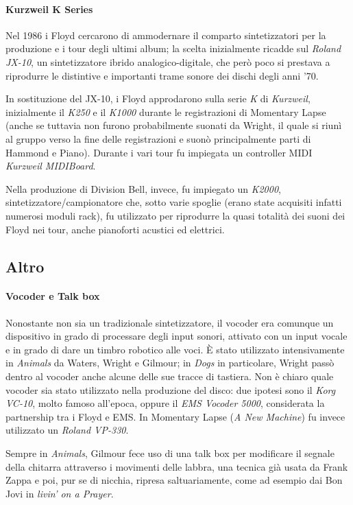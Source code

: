 \documentclass[class=book, crop=false, oneside, 12pt]{standalone}
\begin{document}
    \paragraph{Kurzweil K Series}
    Nel 1986 i Floyd cercarono di ammodernare il comparto sintetizzatori per la produzione e i  tour degli ultimi album; la scelta inizialmente ricadde sul \emph{Roland JX-10}, un sintetizzatore ibrido analogico-digitale, che però poco si prestava a riprodurre le distintive e importanti trame sonore dei dischi degli anni '70.

    In sostituzione del JX-10, i Floyd approdarono sulla serie \emph{K} di \emph{Kurzweil}, inizialmente il \emph{K250} e il \emph{K1000} durante le registrazioni di Momentary Lapse (anche se tuttavia non furono probabilmente suonati da Wright, il quale si riunì al gruppo verso la fine delle registrazioni e suonò principalmente parti di Hammond e Piano). Durante i vari tour fu impiegata un controller MIDI \emph{Kurzweil MIDIBoard}.

    Nella produzione di Division Bell, invece, fu impiegato un \emph{K2000}, sintetizzatore/campionatore che, sotto varie spoglie (erano state acquisiti infatti numerosi moduli rack), fu utilizzato per riprodurre la quasi totalità dei suoni dei Floyd nei tour, anche pianoforti acustici ed elettrici.
    
    \subsection{Altro}
    \paragraph{Vocoder e Talk box}
    Nonostante non sia un tradizionale sintetizzatore, il vocoder era comunque un dispositivo in grado di processare degli input sonori, attivato con un input vocale e in grado di dare un timbro robotico alle voci. È stato utilizzato intensivamente in \emph{Animals} da Waters, Wright e Gilmour; in \emph{Dogs} in particolare, Wright passò dentro al vocoder anche alcune delle sue tracce di tastiera. Non è chiaro quale vocoder sia stato utilizzato nella produzione del disco: due ipotesi sono il \emph{Korg VC-10}, molto famoso all'epoca, oppure il \emph{EMS Vocoder 5000}, considerata la partnership tra i Floyd e EMS. In Momentary Lapse (\emph{A New Machine}) fu invece utilizzato un \emph{ Roland VP-330}.

    Sempre in \emph{Animals}, Gilmour fece uso di una talk box per modificare il segnale della chitarra attraverso i movimenti delle labbra, una tecnica già usata da Frank Zappa e poi, pur se di nicchia, ripresa saltuariamente, come ad esempio dai Bon Jovi in \emph{livin' on a Prayer}.
    
\end{document}
